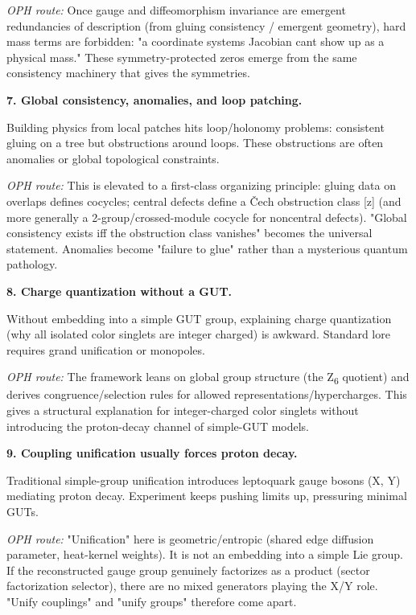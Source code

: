 \emph{OPH route:} Once gauge and diffeomorphism invariance are emergent redundancies of description (from gluing consistency / emergent geometry), hard mass terms are forbidden: "a coordinate system\textquotesingle s Jacobian can\textquotesingle t show up as a physical mass." These symmetry-protected zeros emerge from the same consistency machinery that gives the symmetries.

\textbf{7. Global consistency, anomalies, and loop patching.}

Building physics from local patches hits loop/holonomy problems: consistent gluing on a tree but obstructions around loops. These obstructions are often anomalies or global topological constraints.

\emph{OPH route:} This is elevated to a first-class organizing principle: gluing data on overlaps defines cocycles; central defects define a \v{C}ech obstruction class {[}z{]} (and more generally a 2-group/crossed-module cocycle for noncentral defects). "Global consistency exists iff the obstruction class vanishes" becomes the universal statement. Anomalies become "failure to glue" rather than a mysterious quantum pathology.

\textbf{8. Charge quantization without a GUT.}

Without embedding into a simple GUT group, explaining charge quantization (why all isolated color singlets are integer charged) is awkward. Standard lore requires grand unification or monopoles.

\emph{OPH route:} The framework leans on global group structure (the Z\textsubscript{6} quotient) and derives congruence/selection rules for allowed representations/hypercharges. This gives a structural explanation for integer-charged color singlets without introducing the proton-decay channel of simple-GUT models.

\textbf{9. Coupling unification usually forces proton decay.}

Traditional simple-group unification introduces leptoquark gauge bosons (X, Y) mediating proton decay. Experiment keeps pushing limits up, pressuring minimal GUTs.

\emph{OPH route:} "Unification" here is geometric/entropic (shared edge diffusion parameter, heat-kernel weights). It is not an embedding into a simple Lie group. If the reconstructed gauge group genuinely factorizes as a product (sector factorization selector), there are no mixed generators playing the X/Y role. "Unify couplings" and "unify groups" therefore come apart.

